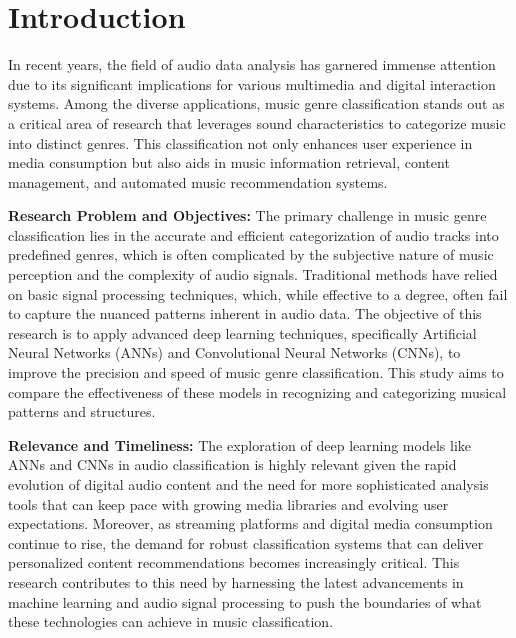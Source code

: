 \documentclass[lettersize,journal]{IEEEtran}
\begin{document}
\section{Introduction}
In recent years, the field of audio data analysis has garnered immense attention due to its significant implications for various multimedia and digital interaction systems. Among the diverse applications, music genre classification stands out as a critical area of research that leverages sound characteristics to categorize music into distinct genres. This classification not only enhances user experience in media consumption but also aids in music information retrieval, content management, and automated music recommendation systems.
\vspace{\baselineskip}

\textbf{Research Problem and Objectives:} The primary challenge in music genre classification lies in the accurate and efficient categorization of audio tracks into predefined genres, which is often complicated by the subjective nature of music perception and the complexity of audio signals. Traditional methods have relied on basic signal processing techniques, which, while effective to a degree, often fail to capture the nuanced patterns inherent in audio data. The objective of this research is to apply advanced deep learning techniques, specifically Artificial Neural Networks (ANNs) and Convolutional Neural Networks (CNNs), to improve the precision and speed of music genre classification. This study aims to compare the effectiveness of these models in recognizing and categorizing musical patterns and structures.
\vspace{\baselineskip}

\textbf{Relevance and Timeliness:} The exploration of deep learning models like ANNs and CNNs in audio classification is highly relevant given the rapid evolution of digital audio content and the need for more sophisticated analysis tools that can keep pace with growing media libraries and evolving user expectations. Moreover, as streaming platforms and digital media consumption continue to rise, the demand for robust classification systems that can deliver personalized content recommendations becomes increasingly critical. This research contributes to this need by harnessing the latest advancements in machine learning and audio signal processing to push the boundaries of what these technologies can achieve in music classification.
\vspace{\baselineskip}
\end{document}
